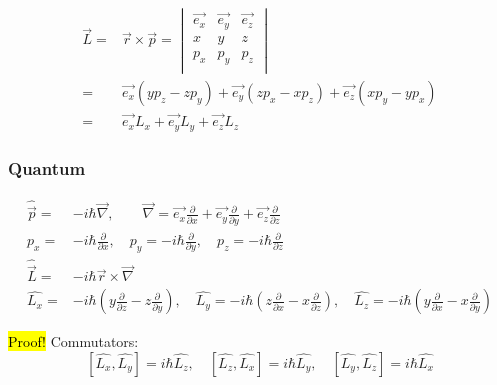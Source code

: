 	\begin{align}
		\vec{L} =& \vec{r}\times\vec{p} =
		\begin{vmatrix}
			\vec{e_x} & \vec{e_y} & \vec{e_z} \\
			x & y & z \\
			p_x & p_y & p_z \\
		\end{vmatrix} \\
		=& \vec{e_x}(yp_z - zp_y) + \vec{e_y}(zp_x - xp_z) + \vec{e_z}(xp_y - yp_x) \\
		=& \vec{e_x}L_x + \vec{e_y}L_y + \vec{e_z}L_z
	\end{align}
	
	\subsubsection{Quantum}
	\begin{align}
		\hat{\vec{p}} =& -i\hbar\vec{\nabla}, \qquad \vec{\nabla} = \vec{e_x}\frac{\partial}{\partial x} + \vec{e_y}\frac{\partial}{\partial y} + \vec{e_z}\frac{\partial}{\partial z} \\
		p_x =& -i\hbar \frac{\partial}{\partial x}, \quad p_y = -i\hbar \frac{\partial}{\partial y}, \quad p_z = -i\hbar \frac{\partial}{\partial z} \\
		\hat{\vec{L}} =& -i\hbar\vec{r}\times\vec{\nabla} \\
		\hat{L_x} =& -i\hbar(y\frac{\partial}{\partial z} - z\frac{\partial}{\partial y}), \quad \hat{L_y} = -i\hbar(z\frac{\partial}{\partial x} - x\frac{\partial}{\partial z}), \quad \hat{L_z} = -i\hbar(y\frac{\partial}{\partial x} - x\frac{\partial}{\partial y}) 
	\end{align}
	
	\hl{Proof!} Commutators:
	\begin{equation}
	\left[\hat{L_x}, \hat{L_y}\right] = i\hbar\hat{L_z}, \quad
	\left[\hat{L_z}, \hat{L_x}\right] = i\hbar\hat{L_y}, \quad
	\left[\hat{L_y}, \hat{L_z}\right] = i\hbar\hat{L_x}
	\end{equation}
	
